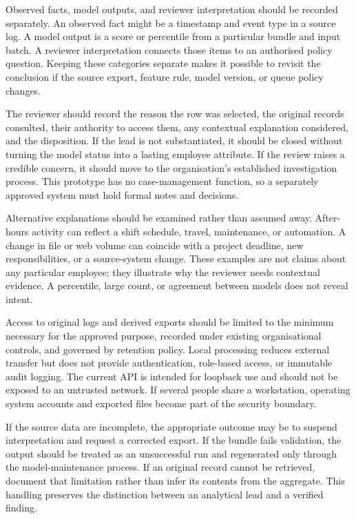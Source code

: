 Observed facts, model outputs, and reviewer interpretation should be
recorded separately. An observed fact might be a timestamp and event
type in a source log. A model output is a score or percentile from a
particular bundle and input batch. A reviewer interpretation connects
those items to an authorised policy question. Keeping these categories
separate makes it possible to revisit the conclusion if the source
export, feature rule, model version, or queue policy changes.

The reviewer should record the reason the row was selected, the
original records consulted, their authority to access them, any
contextual explanation considered, and the disposition. If the lead
is not substantiated, it should be closed without turning the model
status into a lasting employee attribute. If the review raises a
credible concern, it should move to the organisation's established
investigation process. This prototype has no case-management function,
so a separately approved system must hold formal notes and decisions.

Alternative explanations should be examined rather than assumed away.
After-hours activity can reflect a shift schedule, travel, maintenance,
or automation. A change in file or web volume can coincide with a
project deadline, new responsibilities, or a source-system change.
These examples are not claims about any particular employee; they
illustrate why the reviewer needs contextual evidence. A percentile,
large count, or agreement between models does not reveal intent.

Access to original logs and derived exports should be limited to the
minimum necessary for the approved purpose, recorded under existing
organisational controls, and governed by retention policy. Local
processing reduces external transfer but does not provide
authentication, role-based access, or immutable audit logging. The
current API is intended for loopback use and should not be exposed to
an untrusted network. If several people share a workstation, operating
system accounts and exported files become part of the security
boundary.

If the source data are incomplete, the appropriate outcome may be to
suspend interpretation and request a corrected export. If the bundle
fails validation, the output should be treated as an unsuccessful run
and regenerated only through the model-maintenance process. If an
original record cannot be retrieved, document that limitation rather
than infer its contents from the aggregate. This handling preserves
the distinction between an analytical lead and a verified finding.

